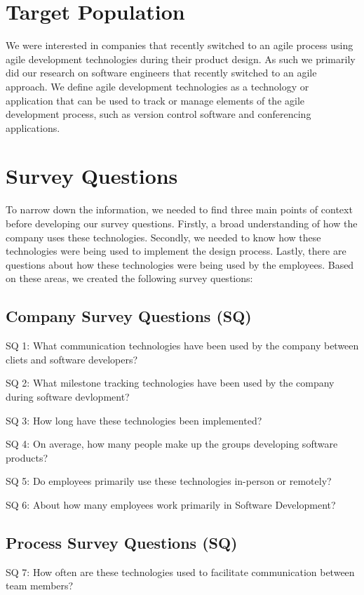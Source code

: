 \documentclass[conference]{IEEEtran}
\begin{document}
\section{Target Population}
We were interested in companies that recently switched to an agile process using agile development technologies during their product design. As such we primarily did our research on software engineers that recently switched to an agile approach. We define agile development technologies as a technology or application that can be used to track or manage elements of the agile development process, such as version control software and conferencing applications. 

\section{Survey Questions}
To narrow down the information, we needed to find three main points of context before developing our survey questions. Firstly, a broad understanding of how the company uses these technologies.  Secondly, we needed to know how these technologies were being used to implement the design process. Lastly, there are questions about how these technologies were being used by the employees. Based on these areas, we created the following survey questions: 

\subsection*{Company Survey Questions (SQ) }
SQ 1: What communication technologies have been used by the company between cliets and software developers? 

SQ 2: What milestone tracking technologies have been used by the company during software devlopment? 

SQ 3: How long have these technologies been implemented? 

SQ 4: On average, how many people make up the groups developing software products?

SQ 5: Do employees primarily use these technologies in-person or remotely? 

SQ 6: About how many employees work primarily in Software Development?

\subsection*{Process Survey Questions (SQ)  }
SQ 7: How often are these technologies used to facilitate communication between team members? 
\end{document}
